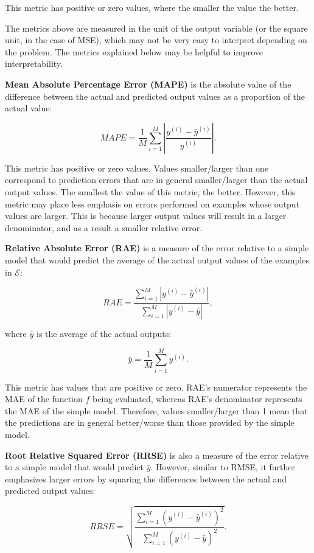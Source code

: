 \noindent This metric has positive or zero values, where the smaller the value the better. 

The metrics above are measured in the unit of the output variable (or the square unit, in the case of MSE), which may not be very easy to interpret depending on the problem. The metrics explained below may be helpful to improve interpretability. 

\textbf{Mean Absolute Percentage Error (MAPE)} is the absolute value of the difference between the actual and predicted output values as a proportion of the actual value:

\[ MAPE = \frac{1}{M} \sum_{i=1}^M \left|\frac{y^{(i)} - \hat{y}^{(i)}}{y^{(i)}}\right|. \]

\noindent This metric has positive or zero values. Values smaller/larger than one correspond to prediction errors that are in general smaller/larger than the actual output values. The smallest the value of this metric, the better. However, this metric may place less emphasis on errors performed on examples whose output values are larger. This is because larger output values will result in a larger denominator, and as a result a smaller relative error.   

\textbf{Relative Absolute Error (RAE)} is a measure of the error relative to a simple model that would predict the average of the actual output values of the examples in $\mathcal{E}$:

\[RAE = \frac{\sum_{i=1}^M |y^{(i)} - \hat{y}^{(i)}|} {\sum_{i=1}^M |y^{(i)} - \bar{y}|}, \]

\noindent where $\bar{y}$ is the average of the actual outputs:

\[\bar{y} = \frac{1}{M}\sum_{i=1}^M y^{(i)}.\]

\noindent This metric has values that are positive or zero. RAE's numerator represents the MAE of the function $f$ being evaluated, whereas RAE's denominator represents the MAE of the simple model. Therefore, values smaller/larger than 1 mean that the predictions are in general better/worse than those provided by the simple model.

\textbf{Root Relative Squared Error (RRSE)} is also a measure of the error relative to a simple model that would predict $\bar{y}$. However, similar to RMSE, it further emphasizes larger errors by squaring the differences between the actual and predicted output values:

\[RRSE = \sqrt{\frac{\sum_{i=1}^M (y^{(i)} - \hat{y}^{(i)})^2} {\sum_{i=1}^M (y^{(i)} - \bar{y})^2}}. \]

